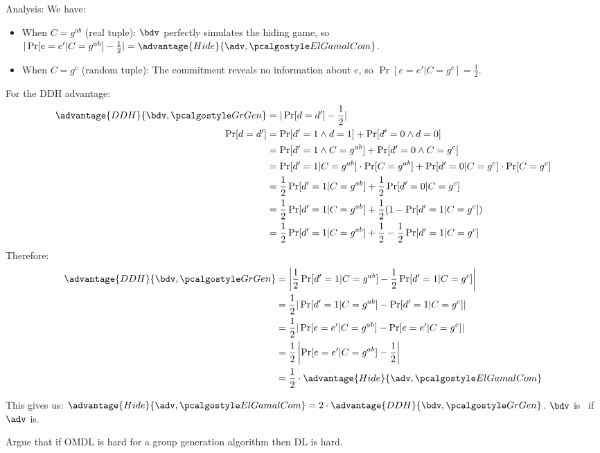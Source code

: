 \begin{mysolution}
  Analysis: We have:
  \begin{itemize}
      \item When $C = g^{ab}$ (real tuple): $\bdv$ perfectly simulates the hiding game, so $|\Pr[e = e' | C = g^{ab}] - \frac{1}{2}| = \advantage{Hide}{\adv, \algo{ElGamalCom}}$.
      \item When $C = g^c$ (random tuple): The commitment reveals no information about $e$, so $\Pr[e = e' | C = g^c] = \frac{1}{2}$.
  \end{itemize}
  For the DDH advantage:
  \begin{align*}
  \advantage{DDH}{\bdv, \grgen} &= |\Pr[d = d'] - \frac{1}{2}|\\
  \Pr[d = d'] &= \Pr[d' = 1 \wedge d = 1] + \Pr[d' = 0 \wedge d = 0]\\
  &= \Pr[d' = 1 \wedge C = g^{ab}] + \Pr[d' = 0 \wedge C = g^c]\\
  &= \Pr[d' = 1 | C = g^{ab}] \cdot \Pr[C = g^{ab}] + \Pr[d' = 0 | C = g^c] \cdot \Pr[C = g^c]\\
  &= \frac{1}{2} \Pr[d' = 1 | C = g^{ab}] + \frac{1}{2} \Pr[d' = 0 | C = g^c]\\
  &= \frac{1}{2} \Pr[d' = 1 | C = g^{ab}] + \frac{1}{2}(1 - \Pr[d' = 1 | C = g^c])\\
  &= \frac{1}{2} \Pr[d' = 1 | C = g^{ab}] + \frac{1}{2} - \frac{1}{2}\Pr[d' = 1 | C = g^c]
  \end{align*}
  Therefore:
  \begin{align*}
  \advantage{DDH}{\bdv, \grgen} &= \left|\frac{1}{2} \Pr[d' = 1 | C = g^{ab}] - \frac{1}{2}\Pr[d' = 1 | C = g^c]\right|\\
  &= \frac{1}{2} |\Pr[d' = 1 | C = g^{ab}] - \Pr[d' = 1 | C = g^c]|\\
  &= \frac{1}{2} |\Pr[e = e' | C = g^{ab}] - \Pr[e = e' | C = g^c]|\\
  &= \frac{1}{2} \left|\Pr[e = e' | C = g^{ab}] - \frac{1}{2}\right|\\
  &= \frac{1}{2} \cdot \advantage{Hide}{\adv, \algo{ElGamalCom}}
  \end{align*}

  This gives us: $\advantage{Hide}{\adv, \algo{ElGamalCom}} = 2 \cdot \advantage{DDH}{\bdv, \grgen}$. $\bdv$ is \ppt\ if $\adv$ is.
\end{mysolution}
\fi

\begin{exercise}
  Argue that if OMDL is hard for a group generation algorithm then DL is hard.
\end{exercise}

